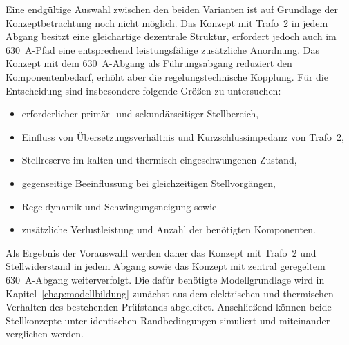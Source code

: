 Eine endgültige Auswahl zwischen den beiden Varianten ist auf Grundlage der
Konzeptbetrachtung noch nicht möglich. Das Konzept mit Trafo~2 in jedem
Abgang besitzt eine gleichartige dezentrale Struktur, erfordert jedoch auch
im \SI{630}{\ampere}-Pfad eine entsprechend leistungsfähige zusätzliche
Anordnung. Das Konzept mit dem \SI{630}{\ampere}-Abgang als Führungsabgang
reduziert den Komponentenbedarf, erhöht aber die regelungstechnische Kopplung.
Für die Entscheidung sind insbesondere folgende Größen zu untersuchen:

\begin{itemize}
    \item erforderlicher primär- und sekundärseitiger Stellbereich,
    \item Einfluss von Übersetzungsverhältnis und Kurzschlussimpedanz von
          Trafo~2,
    \item Stellreserve im kalten und thermisch eingeschwungenen Zustand,
    \item gegenseitige Beeinflussung bei gleichzeitigen Stellvorgängen,
    \item Regeldynamik und Schwingungsneigung sowie
    \item zusätzliche Verlustleistung und Anzahl der benötigten Komponenten.
\end{itemize}

Als Ergebnis der Vorauswahl werden daher das Konzept mit Trafo~2 und
Stellwiderstand in jedem Abgang sowie das Konzept mit zentral geregeltem
\SI{630}{\ampere}-Abgang weiterverfolgt. Die dafür benötigte Modellgrundlage
wird in Kapitel~\ref{chap:modellbildung} zunächst aus dem elektrischen und
thermischen Verhalten des bestehenden Prüfstands abgeleitet. Anschließend
können beide Stellkonzepte unter identischen Randbedingungen simuliert und
miteinander verglichen werden.

\endgroup